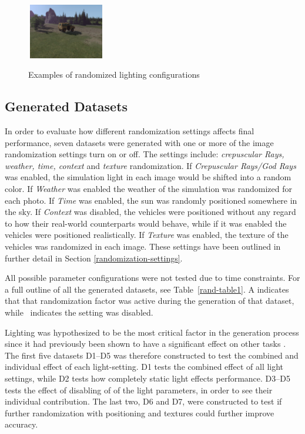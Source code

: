 \begin{figure}[H]
\subcaptionbox{}%
  {\includegraphics[height=2.4cm, width=3.4cm]{images/vbs3/realistic-lighting/light-variation/car/4.png}}
\caption{Examples of randomized lighting configurations}
\label{lighting-example}
\end{figure}

\subsection{Generated Datasets} \label{dataset-summary}
In order to evaluate how different randomization settings affects final performance, seven datasets were generated with one or more of the image randomization settings turn on or off. The settings include: \textit{crepuscular Rays, weather, time, context} and \textit{texture} randomization. If \textit{Crepuscular Rays/God Rays} was enabled, the simulation light in each image would be shifted into a random color. If \textit{Weather} was enabled the weather of the simulation was randomized for each photo. If \textit{Time} was enabled, the sun was randomly positioned somewhere in the sky. If \textit{Context} was disabled, the vehicles were positioned without any regard to how their real-world counterparts would behave, while if it was enabled the vehicles were positioned realistically. If \textit{Texture} was enabled, the texture of the vehicles was randomized in each image. These settings have been outlined in further detail in Section \ref{randomization-settings}.

All possible parameter configurations were not tested due to time constraints. For a full outline of all the generated datasets, see Table~\ref{rand-table1}. A \checkmark indicates that that randomization factor was active during the generation of that dataset, while \xmark ~indicates the setting was disabled.

Lighting was hypothesized to be the most critical factor in the generation process since it had previously been shown to have a significant effect on other tasks \cite{domainrand, goodsynthetic}. The first five datasets D1--D5 was therefore constructed to test the combined and individual effect of each light-setting. D1 tests the combined effect of all light settings, while D2 tests how completely static light effects performance. D3--D5 tests the effect of disabling of of the light parameters, in order to see their individual contribution. The last two, D6 and D7, were constructed to test if further randomization with positioning and textures could further improve accuracy.

